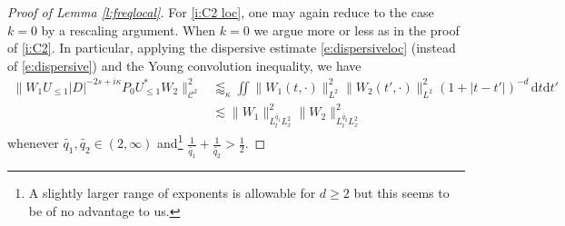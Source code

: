 \documentclass[a4paper]{amsart}
\numberwithin{equation}{section}%
\theoremstyle{plain}%
\theoremstyle{definition}
\theoremstyle{remark}%
\def\d{\mathrm{d}}
\def\C{\mathcal{C}}
\def\C{\mathcal{C}}
\begin{document}
\begin{proof}[Proof of Lemma \ref{l:freqlocal}]
For \eqref{i:C2 loc}, one may again reduce to the case $k = 0$ by a rescaling argument. When $k = 0$ we argue more or less as in the proof of \eqref{i:C2}. In particular, applying the dispersive estimate \eqref{e:dispersiveloc} (instead of \eqref{e:dispersive}) and the Young convolution inequality, we have
\begin{align*}
    \|W_1U_{\leq 1}|D|^{-2s+i\kappa}P_0U_{\leq 1}^*W_2\|_{\C^2}^2
    & \lessapprox_\kappa
\iint\|W_1(t,\cdot)\|_{L^2}^2\|W_2(t',\cdot)\|_{L^2}^2(1+|t-t'|)^{-d}\,\d t\d t'\\
    & \lesssim
    \|W_1\|_{L^{\widetilde{q_1}}_tL^2_x}^2
    \|W_2\|_{L^{\widetilde{q_2}}_tL^2_x}^2
\end{align*}
whenever $\widetilde{q_1},\widetilde{q_2}\in (2,\infty)$ and\footnote{A slightly larger range of exponents is allowable for $d \geq 2$ but this seems to be of no advantage to us.} $\frac{1}{\widetilde{q_1}}+\frac{1}{\widetilde{q_2}}>\frac12$. 
\end{proof}
\end{document}
